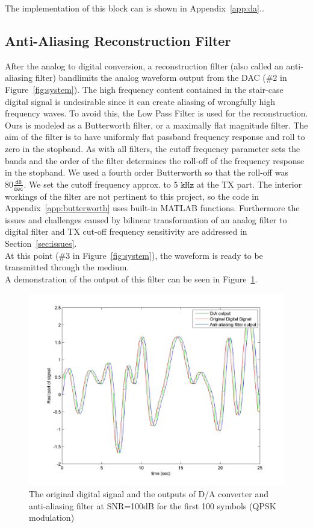 \documentclass[]{article}
\begin{document}
The implementation of this block can is shown in Appendix~\ref{app:da}..

\subsection{Anti-Aliasing Reconstruction Filter}
\label{sec:reconstruction}
After the analog to digital conversion, a reconstruction filter (also called an anti-aliasing filter) bandlimits the analog waveform output from the DAC (\#2 in Figure~\ref{fig:system}).  The high frequency content contained in the stair-case digital signal is undesirable since it can create aliasing of wrongfully high frequency waves. To avoid this, the Low Pass Filter is used for the reconstruction.  Ours is modeled as a Butterworth filter, or a maximally flat magnitude filter.  The aim of the filter is to have uniformly flat passband frequency response and roll to zero in the stopband.  As with all filters, the cutoff frequency parameter sets the bands and the order of the filter determines the roll-off of the frequency response in the stopband.  We used a fourth order Butterworth so that the roll-off was $80 \mathtt{\frac{dB}{dec}}$.  We set the cutoff frequency approx. to 5 $\mathtt{kHz}$ at the TX part. The interior workings of the filter are not pertinent to this project, so the code in Appendix~\ref{app:butterworth} uses built-in MATLAB functions. Furthermore the issues and challenges caused by bilinear transformation of an analog filter to digital filter and TX cut-off frequency sensitivity are addressed in Section~\ref{sec:issues}. \\

At this point (\#3 in Figure~\ref{fig:system}), the waveform is ready to be transmitted through the medium.\\

A demonstration of the output of this filter can be seen in Figure~\ref{fig:dtoa}.

\begin{figure}[H]
\centering
\includegraphics[width=\textwidth]{DtoA.jpg}
\caption{The original digital signal and the outputs of D/A converter and anti-aliasing filter at SNR=100dB for the first 100 symbols (QPSK modulation)\label{fig:dtoa}}
\end{figure}
\end{document}
